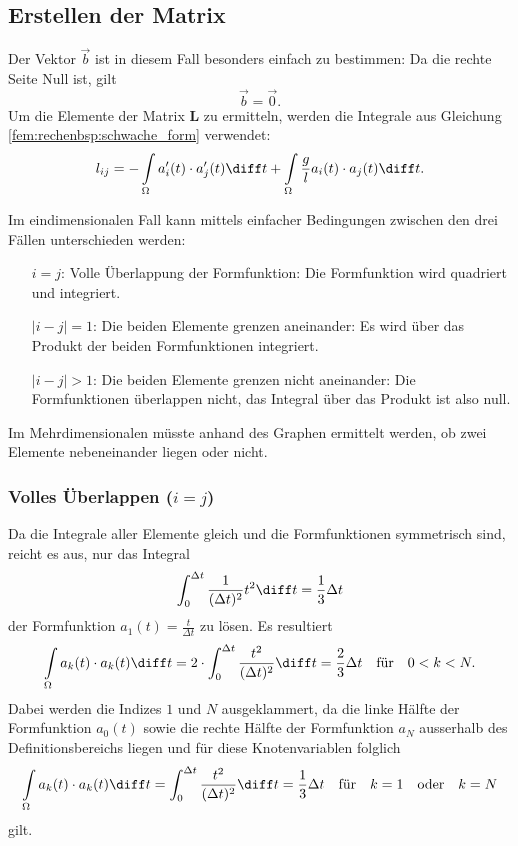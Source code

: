 \subsection{Erstellen der Matrix}
Der Vektor $\vec{b}$ ist in diesem Fall besonders einfach zu bestimmen: Da die rechte Seite Null ist, gilt
\begin{equation}
    \vec{b} = \vec{0}.
\end{equation}
Um die Elemente der Matrix $\mathbf{L}$ zu ermitteln, werden die Integrale aus Gleichung \ref{fem:rechenbsp:schwache_form} verwendet:
\begin{equation}
    l_{ij} = - \int\limits_\Omega a_i'(t) \cdot a_j'(t) \diff t + \int\limits_\Omega \frac{g}{l} a_i(t) \cdot a_j(t) \diff t.
\end{equation}

Im eindimensionalen Fall kann mittels einfacher Bedingungen zwischen den drei Fällen unterschieden werden:
\begin{itemize}
    \item[$i = j$:] Volle Überlappung der Formfunktion: Die Formfunktion wird quadriert und integriert. 
    \item[$|i - j| = 1$:] Die beiden Elemente grenzen aneinander: Es wird über das Produkt der beiden Formfunktionen integriert.
    \item[$|i - j| > 1$:] Die beiden Elemente grenzen nicht aneinander: Die Formfunktionen überlappen nicht, das Integral über das Produkt ist also null.
\end{itemize}
Im Mehrdimensionalen müsste anhand des Graphen ermittelt werden, ob zwei Elemente nebeneinander liegen oder nicht.

\subsubsection{Volles Überlappen ($i = j$)}
Da die Integrale aller Elemente gleich und die Formfunktionen symmetrisch sind, reicht es aus, nur das Integral
\begin{equation}
    \int_{0}^{\Delta t} \frac{1}{(\Delta t)^2} t^2 \diff t = \frac{1}{3} \Delta t
\end{equation}
der Formfunktion $ a_1(t) = \frac{t}{\Delta t} $ zu lösen.
Es resultiert
\begin{equation}
    \int\limits_\Omega a_k(t) \cdot a_k(t) \diff t = 2 \cdot \int_{0}^{\Delta t} \frac{t^2}{(\Delta t)^2} \diff t = \frac{2}{3} \Delta t \quad \text{für} \quad 0 < k < N.
\end{equation}
Dabei werden die Indizes $1$ und $N$ ausgeklammert, da die linke Hälfte der Formfunktion $a_0(t)$ sowie die rechte Hälfte der Formfunktion $a_N$ ausserhalb des Definitionsbereichs liegen und für diese Knotenvariablen folglich
\begin{equation}
    \int\limits_\Omega a_k(t) \cdot a_k(t) \diff t = \int_{0}^{\Delta t} \frac{t^2}{(\Delta t)^2} \diff t = \frac{1}{3} \Delta t \quad \text{für} \quad k = 1 \quad \text{oder} \quad k = N
\end{equation}
gilt.

